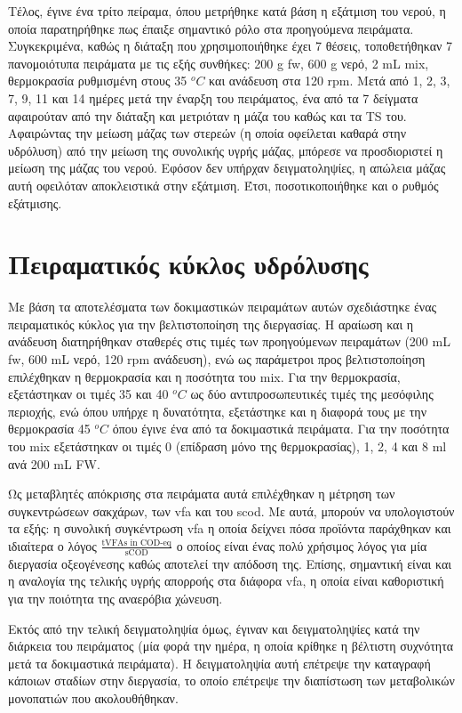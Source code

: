 \documentclass[11pt]{report}
\begin{document}
Τέλος, έγινε ένα τρίτο πείραμα, όπου μετρήθηκε κατά βάση η εξάτμιση του νερού, η οποία παρατηρήθηκε πως έπαιξε σημαντικό ρόλο στα προηγούμενα πειράματα. Συγκεκριμένα, καθώς η διάταξη που χρησιμοποιήθηκε έχει 7 θέσεις, τοποθετήθηκαν 7 πανομοιότυπα πειράματα με τις εξής συνθήκες: 200 g \acrshort{fw}, 600 g νερό, 2 mL \acrshort{mix}, θερμοκρασία ρυθμισμένη στους 35 \(^oC\) και ανάδευση στα 120 rpm. Μετά από 1, 2, 3, 7, 9, 11 και 14 ημέρες μετά την έναρξη του πειράματος, ένα από τα 7 δείγματα αφαιρούταν από την διάταξη και μετριόταν η μάζα του καθώς και τα TS του. Αφαιρώντας την μείωση μάζας των στερεών (η οποία οφείλεται καθαρά στην υδρόλυση) από την μείωση της συνολικής υγρής μάζας, μπόρεσε να προσδιοριστεί η μείωση της μάζας του νερού. Εφόσον δεν υπήρχαν δειγματοληψίες, η απώλεια μάζας αυτή οφειλόταν αποκλειστικά στην εξάτμιση. Έτσι, ποσοτικοποιήθηκε και ο ρυθμός εξάτμισης.

\section{Πειραματικός κύκλος υδρόλυσης}
\label{sec:orgcda9404}
\label{sec:lab-hydro}
Με βάση τα αποτελέσματα των δοκιμαστικών πειραμάτων αυτών σχεδιάστηκε ένας πειραματικός κύκλος για την βελτιστοποίηση της διεργασίας. Η αραίωση και η ανάδευση διατηρήθηκαν σταθερές στις τιμές των προηγούμενων πειραμάτων (200 mL \acrshort{fw}, 600 mL νερό, 120 rpm ανάδευση), ενώ ως παράμετροι προς βελτιστοποίηση επιλέχθηκαν η θερμοκρασία και η ποσότητα του \acrshort{mix}. Για την θερμοκρασία, εξετάστηκαν οι τιμές 35 και 40 \(^oC\) ως δύο αντιπροσωπευτικές τιμές της μεσόφιλης περιοχής, ενώ όπου υπήρχε η δυνατότητα, εξετάστηκε και η διαφορά τους με την θερμοκρασία 45 \(^oC\) όπου έγινε ένα από τα δοκιμαστικά πειράματα. Για την ποσότητα του \acrshort{mix} εξετάστηκαν οι τιμές 0 (επίδραση μόνο της θερμοκρασίας), 1, 2, 4 και 8 ml ανά 200 mL FW. 

Ως μεταβλητές απόκρισης στα πειράματα αυτά επιλέχθηκαν η μέτρηση των συγκεντρώσεων σακχάρων, των \acrshort{vfa} και του \acrshort{scod}.  Με αυτά, μπορούν να υπολογιστούν τα εξής: η συνολική συγκέντρωση \acrshort{vfa} η οποία δείχνει πόσα προϊόντα παράχθηκαν και ιδιαίτερα ο λόγος \(\frac{\text{tVFAs in COD-eq}}{\text{sCOD}}\) ο οποίος είναι ένας πολύ χρήσιμος λόγος για μία διεργασία οξεογένεσης καθώς αποτελεί την απόδοση της. Επίσης, σημαντική είναι και η αναλογία της τελικής υγρής απορροής στα διάφορα \acrshort{vfa}, η οποία είναι καθοριστική για την ποιότητα της αναερόβια χώνευση.

Εκτός από την τελική δειγματοληψία όμως, έγιναν και δειγματοληψίες κατά την διάρκεια του πειράματος (μία φορά την ημέρα, η οποία κρίθηκε η βέλτιστη συχνότητα μετά τα δοκιμαστικά πειράματα). Η δειγματοληψία αυτή επέτρεψε την καταγραφή κάποιων σταδίων στην διεργασία, το οποίο επέτρεψε την διαπίστωση των μεταβολικών μονοπατιών που ακολουθήθηκαν.
\end{document}
